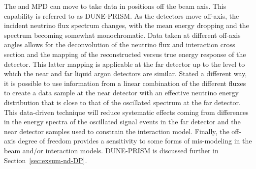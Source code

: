 The  and MPD can move to take data in positions off the beam axis.  This capability is referred to as DUNE-PRISM. As the detectors move off-axis, the incident neutrino flux spectrum changes, with the mean energy dropping and the spectrum becoming somewhat monochromatic.  Data taken at different off-axis angles allows for the deconvolution of the neutrino flux and interaction cross section and the mapping of the reconstructed versus true energy response of the detector.  This latter mapping is applicable at the far detector up to the level to which the near and far liquid argon detectors are similar.  Stated a different way, it is possible to use information from a linear combination of the different fluxes to create a data sample at the near detector with an effective neutrino energy distribution that is close to that of the oscillated spectrum at the far detector.  This data-driven technique will reduce systematic effects coming from differences in the energy spectra of the oscillated signal events in the far detector and the near detector samples used to constrain the interaction model. Finally, the off-axis degree of freedom provides a sensitivity to some forms of mis-modeling in the beam and/or interaction models. DUNE-PRISM is discussed further in Section~\ref{sec:exsum-nd-DP}.


